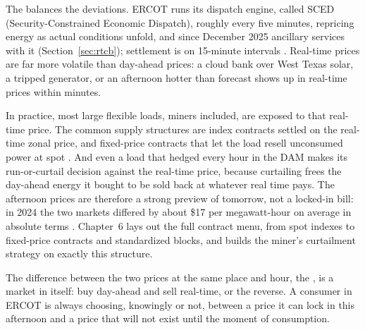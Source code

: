 The  balances the deviations. ERCOT runs its dispatch engine, called SCED (Security-Constrained Economic Dispatch), roughly every five minutes, repricing energy as actual conditions unfold, and since December 2025 ancillary services with it (Section~\ref{sec:rtcb}); settlement is on 15-minute intervals \autocite{ercot2026rtm,ercot2026protocols}. %
Real-time prices are far more volatile than day-ahead prices: a cloud bank over West Texas solar, a tripped generator, or an afternoon hotter than forecast shows up in real-time prices within minutes.

In practice, most large flexible loads, miners included, are exposed to that real-time price. The common supply structures are index contracts settled on the real-time zonal price, and fixed-price contracts that let the load resell unconsumed power at spot \autocite{potomac2024som}. %
And even a load that hedged every hour in the DAM makes its run-or-curtail decision against the real-time price, because curtailing frees the day-ahead energy it bought to be sold back at whatever real time pays. The afternoon prices are therefore a strong preview of tomorrow, not a locked-in bill: in 2024 the two markets differed by about \$17 per megawatt-hour on average in absolute terms \autocite{potomac2024som}. %
Chapter~6 lays out the full contract menu, from spot indexes to fixed-price contracts and standardized blocks, and builds the miner's curtailment strategy on exactly this structure.

The difference between the two prices at the same place and hour, the , is a market in itself: buy day-ahead and sell real-time, or the reverse. A consumer in ERCOT is always choosing, knowingly or not, between a price it can lock in this afternoon and a price that will not exist until the moment of consumption.

